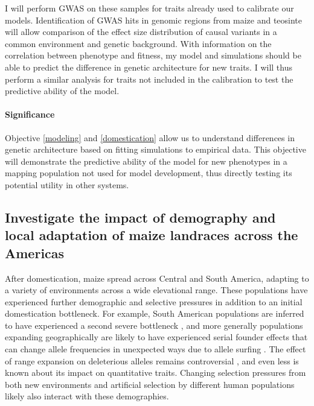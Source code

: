 I will perform GWAS on these samples for traits already used to calibrate our models. Identification of GWAS hits in genomic regions  from maize and teosinte will allow comparison of the effect size distribution of causal variants in a common environment and genetic background. With information on the correlation between phenotype and fitness, my model and simulations should be able to predict the difference in genetic architecture for new traits. I will thus perform a similar analysis for traits not included in the calibration to test the predictive ability of the model. 

\vspace{-2ex}
\paragraph{Significance}
Objective \ref{modeling} and \ref{domestication} allow us to understand differences in genetic architecture based on fitting simulations to empirical data. This objective will demonstrate the predictive ability of the model for new phenotypes in a mapping population not used for model development, thus directly testing its potential utility in other systems.

\vspace{-1ex}
\subsection{Investigate the impact of demography and local adaptation of maize landraces across the Americas} \vspace{-1ex}
\label{surfing}
After domestication, maize spread across Central and South America, adapting to a variety of environments across a wide elevational range. These populations have experienced further demographic and selective pressures in addition to an initial domestication bottleneck. For example, South American populations are inferred to have experienced a second severe bottleneck \citep{Takuno:2015eu}, and more generally populations expanding geographically are likely to have experienced serial founder effects that can change allele frequencies in unexpected ways due to allele surfing \citep{Klopfstein:2005bl}. The effect of range expansion on deleterious alleles remains controversial \citep{Henn:2015ce, Henn:2015dp, Simons:2014fj, Sudmant:2015}, and even less is known about its impact on quantitative traits. Changing selection pressures from both new environments and artificial selection by different human populations likely also interact with these demographies. 

